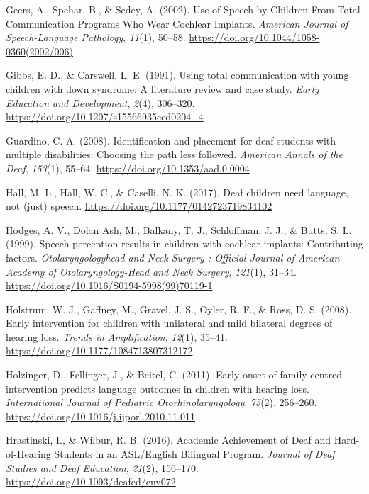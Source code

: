 \documentclass[english,man,floatsintext]{apa6}
\begin{document}
\leavevmode\hypertarget{ref-geers2002}{}%
Geers, A., Spehar, B., \& Sedey, A. (2002). Use of Speech by Children From Total Communication Programs Who Wear Cochlear Implants. \emph{American Journal of Speech-Language Pathology}, \emph{11}(1), 50--58. \url{https://doi.org/10.1044/1058-0360(2002/006)}

\leavevmode\hypertarget{ref-gibbs1991}{}%
Gibbs, E. D., \& Carswell, L. E. (1991). Using total communication with young children with down syndrome: A literature review and case study. \emph{Early Education and Development}, \emph{2}(4), 306--320. \url{https://doi.org/10.1207/s15566935eed0204_4}

\leavevmode\hypertarget{ref-guardino2008}{}%
Guardino, C. A. (2008). Identification and placement for deaf students with multiple disabilities: Choosing the path less followed. \emph{American Annals of the Deaf}, \emph{153}(1), 55--64. \url{https://doi.org/10.1353/aad.0.0004}

\leavevmode\hypertarget{ref-hall2017}{}%
Hall, M. L., Hall, W. C., \& Caselli, N. K. (2017). Deaf children need language, not (just) speech. \url{https://doi.org/10.1177/0142723719834102}

\leavevmode\hypertarget{ref-hodges1999}{}%
Hodges, A. V., Dolan Ash, M., Balkany, T. J., Schloffman, J. J., \& Butts, S. L. (1999). Speech perception results in children with cochlear implants: Contributing factors. \emph{Otolaryngologyhead and Neck Surgery : Official Journal of American Academy of Otolaryngology-Head and Neck Surgery}, \emph{121}(1), 31--34. \url{https://doi.org/10.1016/S0194-5998(99)70119-1}

\leavevmode\hypertarget{ref-holstrum2008}{}%
Holstrum, W. J., Gaffney, M., Gravel, J. S., Oyler, R. F., \& Ross, D. S. (2008). Early intervention for children with unilateral and mild bilateral degrees of hearing loss. \emph{Trends in Amplification}, \emph{12}(1), 35--41. \url{https://doi.org/10.1177/1084713807312172}

\leavevmode\hypertarget{ref-holzinger2011}{}%
Holzinger, D., Fellinger, J., \& Beitel, C. (2011). Early onset of family centred intervention predicts language outcomes in children with hearing loss. \emph{International Journal of Pediatric Otorhinolaryngology}, \emph{75}(2), 256--260. \url{https://doi.org/10.1016/j.ijporl.2010.11.011}

\leavevmode\hypertarget{ref-hrastinski2016}{}%
Hrastinski, I., \& Wilbur, R. B. (2016). Academic Achievement of Deaf and Hard-of-Hearing Students in an ASL/English Bilingual Program. \emph{Journal of Deaf Studies and Deaf Education}, \emph{21}(2), 156--170. \url{https://doi.org/10.1093/deafed/env072}
\end{document}
